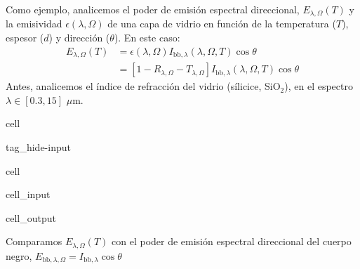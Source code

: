 \documentclass[letterpaper,10pt,english]{jupyterBook}
\begin{document}
\sphinxAtStartPar
Como ejemplo, analicemos el poder de emisión espectral direccional, \(E_{\lambda,\Omega}(T)\) y la emisividad \(\epsilon(\lambda,\Omega)\) de una capa de vidrio en función de la temperatura (\(T\)), espesor (\(d\)) y dirección (\(\theta\)). En este caso:
\begin{align*}
E_{\lambda,\Omega}(T) &= \epsilon(\lambda,\Omega)I_{\mathrm{bb},\lambda}(\lambda,\Omega,T)\cos\theta \\[10pt]
 &= \left[1 - R_{\lambda,\Omega} - T_{\lambda,\Omega}\right]I_{\mathrm{bb},\lambda}(\lambda,\Omega,T)\cos\theta
\end{align*}
\sphinxAtStartPar
Antes, analicemos el índice de refracción del vidrio (sílicice, SiO\(_2\)), en el espectro \(\lambda\in[0.3,15]\) \(\mu\)m.

\begin{sphinxuseclass}{cell}
\begin{sphinxuseclass}{tag_hide-input}
\end{sphinxuseclass}
\end{sphinxuseclass}
\begin{sphinxuseclass}{cell}\begin{sphinxVerbatimInput}

\begin{sphinxuseclass}{cell_input}
\begin{sphinxVerbatim}[commandchars=\\\{\}]
\end{sphinxVerbatim}

\end{sphinxuseclass}\end{sphinxVerbatimInput}
\begin{sphinxVerbatimOutput}

\begin{sphinxuseclass}{cell_output}
\noindent{}

\end{sphinxuseclass}\end{sphinxVerbatimOutput}

\end{sphinxuseclass}
\sphinxAtStartPar
Comparamos \(E_{\lambda,\Omega}(T)\) con el poder de emisión espectral direccional del cuerpo negro, \(E_{\mathrm{bb},\lambda,\Omega} = I_{\mathrm{bb},\lambda}\cos\theta\)
\end{document}
